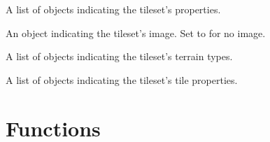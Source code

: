 \documentclass[letterpaper,10pt,english]{sphinxmanual}
\begin{document}
\begin{fulllineitems}

\begin{fulllineitems}
\label{index:tmx.Tileset.properties}
A list of {\hyperref[index:tmx.Property]{\emph{}}} objects indicating the tileset's
properties.

\end{fulllineitems}


\begin{fulllineitems}
\label{index:tmx.Tileset.image}
An {\hyperref[index:tmx.Image]{\emph{}}} object indicating the tileset's image.  Set to
 for no image.

\end{fulllineitems}


\begin{fulllineitems}
\label{index:tmx.Tileset.terraintypes}
A list of {\hyperref[index:tmx.TerrainType]{\emph{}}} objects indicating the tileset's
terrain types.

\end{fulllineitems}


\begin{fulllineitems}
\label{index:tmx.Tileset.tiles}
A list of {\hyperref[index:tmx.Tile]{\emph{}}} objects indicating the tileset's tile
properties.

\end{fulllineitems}


\end{fulllineitems}



\chapter{Functions}
\label{index:functions}
\end{document}

